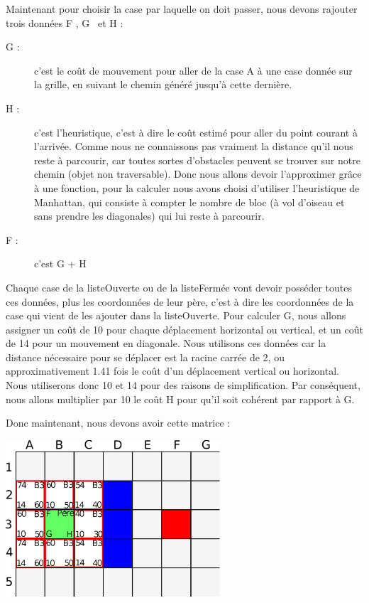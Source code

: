 			Maintenant pour choisir la case par laquelle on doit passer, nous devons rajouter trois données \og F \fg , \og G \fg \, et \og H \fg:
			\begin{description}
				\item[G : ]{c'est le coût de mouvement pour aller de la case A à une case donnée sur la grille, en suivant le chemin généré jusqu'à cette dernière.}
				\item[H :]{c'est l'heuristique, c'est à dire le coût estimé pour aller du point courant à l'arrivée. Comme nous ne connaissons pas vraiment la distance qu'il nous reste à parcourir, car toutes sortes d'obstacles peuvent se trouver sur notre chemin (objet non traversable). Donc nous allons devoir l'approximer grâce à une fonction, pour la calculer nous avons choisi d'utiliser l'heuristique de Manhattan, qui consiste à compter le nombre de bloc (à vol d'oiseau et sans prendre les diagonales) qui lui reste à parcourir.}
				\item[F :]{c'est G + H}
			\end{description} 
		
			Chaque case de la listeOuverte ou de la listeFermée vont devoir posséder toutes ces données, plus les coordonnées de leur père, c'est à dire les coordonnées de la case qui vient de les ajouter dans la listeOuverte. Pour calculer G, nous allons assigner un coût de 10 pour chaque déplacement horizontal ou vertical, et un coût de 14 pour un mouvement en diagonale. Nous utilisons ces données car la distance nécessaire pour se déplacer est la racine carrée de 2, ou approximativement 1.41 fois le coût d'un déplacement vertical ou horizontal. Nous utiliserons donc 10 et 14 pour des raisons de simplification. Par conséquent, nous allons multiplier par 10 le coût H pour qu'il soit cohérent par rapport à G.
	
			Donc maintenant, nous devons avoir cette matrice :
			\begin{center}
				\includegraphics[width=8cm]{./Analyse/Img/Grille3.eps}
			\end{center}
		
